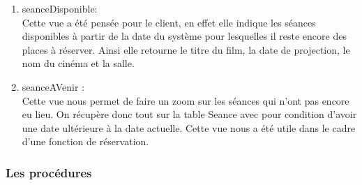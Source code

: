 \documentclass[a4paper,sffamily,12pt]{article}
\begin{document}
					\begin{enumerate}[label=\ding{228}]

						\item seanceDisponible: \\
						
							Cette vue a été pensée pour le client, en effet elle indique les séances disponibles à partir de la date du système pour lesquelles il reste encore des places à réserver. Ainsi elle retourne le titre du film, la date de projection, le nom du cinéma et la salle. \\
												
						\item seanceAVenir : \\
						
						Cette vue nous permet de faire un zoom sur les séances qui n'ont pas encore eu lieu. On récupère donc tout sur la table Seance avec pour condition d'avoir une date ultérieure à la date actuelle. Cette vue nous a été utile dans le cadre d'une fonction de réservation.\\
																	
					\end{enumerate}					
								
				\subsubsection{Les procédures}
				
					\vspace{0.5cm}
\end{document}

